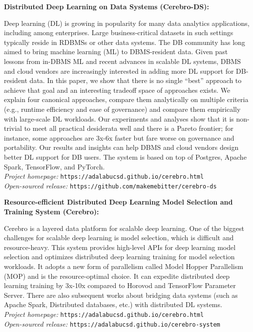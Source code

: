 \documentclass[margin,line]{res}
\begin{document}
\begin{resume}
{\bf Distributed Deep Learning on Data Systems (Cerebro-DS):}

Deep learning (DL) is growing in popularity for many data analytics applications, including among enterprises. Large business-critical datasets in such settings typically reside in RDBMSs or other data systems. The DB community has long aimed to bring machine learning (ML) to DBMS-resident data. Given past lessons from in-DBMS ML and recent advances in scalable DL systems, DBMS and cloud vendors are increasingly interested in adding more DL support for DB-resident data. In this paper, we show that there is no single ``best'' approach to achieve that goal and an interesting tradeoff space of approaches exists. We explain four canonical approaches, compare them analytically on multiple criteria (e.g., runtime efficiency and ease of governance) and compare them empirically with large-scale DL workloads. Our experiments and analyses show that it is non-trivial to meet all practical desiderata well and there is a Pareto frontier; for instance, some approaches are 3x-6x faster but fare worse on governance and portability. Our results and insights can help DBMS and cloud vendors design better DL support for DB users. The system is based on top of Postgres, Apache Spark, TensorFlow, and PyTorch. \\
\textit{Project homepage: }\texttt{https://adalabucsd.github.io/cerebro.html}\\
\textit{Open-sourced release: }\texttt{https://github.com/makemebitter/cerebro-ds}

{\bf Resource-efficient Distributed Deep Learning Model Selection and Training System (Cerebro):}

Cerebro is a layered data platform for scalable deep learning. One of the biggest challenges for scalable deep learning is model selection, which is difficult and resource-heavy. This system provides high-level APIs for deep learning model selection and optimizes distributed deep learning training for model selection workloads. It adopts a new form of parallelism called Model Hopper Parallelism (MOP) and is the resource-optimal choice. It can expedite distributed deep learning training by 3x-10x compared to Horovod and TensorFlow Parameter Server. There are also subsequent works about bridging data systems (such as Apache Spark, Distributed databases, etc.) with distributed DL systems.\\
\textit{Project homepage: }\texttt{https://adalabucsd.github.io/cerebro.html}\\
\textit{Open-sourced release: }\texttt{https://adalabucsd.github.io/cerebro-system}


\end{resume}
\end{document}
